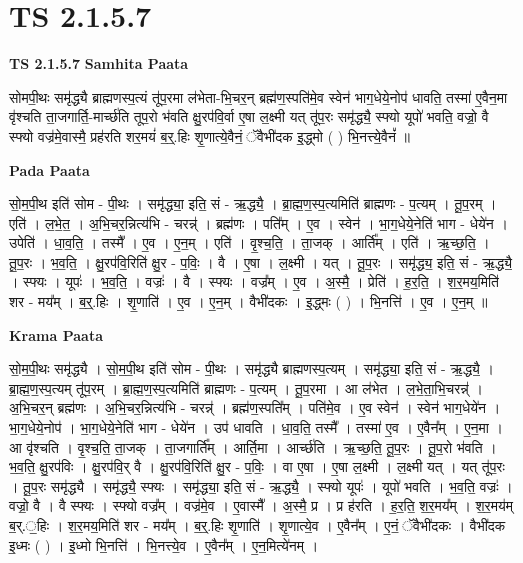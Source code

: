 \documentclass[17pt]{extarticle}
\begin{document}
\section{ TS 2.1.5.7 }

\textbf{TS 2.1.5.7 } \newline
\textbf{Samhita Paata} \newline

सोमपी॒थः समृ॑द्ध्यै ब्राह्मणस्प॒त्यं तू॑प॒रमा ल॑भेता-भि॒चर॒न् ब्रह्म॑ण॒स्पति॑मे॒व स्वेन॑ भाग॒धेये॒नोप॑ धावति॒ तस्मा॑ ए॒वैन॒मा वृ॑श्चति ता॒जगार्ति॒-मार्च्छ॑ति तूप॒रो भ॑वति क्षु॒रप॑वि॒र्वा ए॒षा ल॒क्ष्मी यत् तू॑प॒रः समृ॑द्ध्यै॒ स्फ्यो यूपो॑ भवति॒ वज्रो॒ वै स्फ्यो वज्र॑मे॒वास्मै॒ प्रह॑रति शर॒मयं॑ ब॒र्॒.हिः शृ॒णात्ये॒वैनं॒ ॅवैभी॑दक इ॒द्ध्मो ( ) भि॒नत्त्ये॒वैनं᳚ ॥ \newline

\textbf{Pada Paata} \newline

सो॒म॒पी॒थ इति॑ सोम - पी॒थः । समृ॑द्ध्या॒ इति॒ सं - ऋ॒द्ध्यै॒ । ब्रा॒ह्म॒ण॒स्प॒त्यमिति॑ ब्राह्मणः - प॒त्यम् । तू॒प॒रम् । एति॑ । ल॒भे॒त॒ । अ॒भि॒चर॒न्नित्य॑भि - चरन्न्॑ । ब्रह्म॑णः । पति᳚म् । ए॒व । स्वेन॑ । भा॒ग॒धेये॒नेति॑ भाग - धेये॑न । उपेति॑ । धा॒व॒ति॒ । तस्मै᳚ । ए॒व । ए॒न॒म् । एति॑ । वृ॒श्च॒ति॒ । ता॒जक् । आर्ति᳚म् । एति॑ । ऋ॒च्छ॒ति॒ । तू॒प॒रः । भ॒व॒ति॒ । क्षु॒रप॑वि॒रिति॑ क्षु॒र - प॒विः॒ । वै । ए॒षा । ल॒क्ष्मी । यत् । तू॒प॒रः । समृ॑द्ध्य॒ इति॒ सं - ऋ॒द्ध्यै॒ । स्फ्यः । यूपः॑ । भ॒व॒ति॒ । वज्रः॑ । वै । स्फ्यः । वज्र᳚म् । ए॒व । अ॒स्मै॒ । प्रेति॑ । ह॒र॒ति॒ । श॒र॒मय॒मिति॑ शर - मय᳚म् । ब॒र्॒.हिः । शृ॒णाति॑ । ए॒व । ए॒न॒म् । वैभी॑दकः । इ॒द्ध्मः ( ) । भि॒नत्ति॑ । ए॒व । ए॒न॒म् ॥  \newline


\textbf{Krama Paata} \newline

सो॒म॒पी॒थः समृ॑द्ध्यै । सो॒म॒पी॒थ इति॑ सोम - पी॒थः । समृ॑द्ध्यै ब्राह्मणस्प॒त्यम् । समृ॑द्ध्या॒ इति॒ सं - ऋ॒द्ध्यै॒ । ब्रा॒ह्म॒ण॒स्प॒त्यम् तू॑प॒रम् । ब्रा॒ह्म॒ण॒स्प॒त्यमिति॑ ब्राह्मणः - प॒त्यम् । तू॒प॒रमा । आ ल॑भेत । ल॒भे॒ता॒भि॒चरन्न्॑ । अ॒भि॒चर॒न् ब्रह्म॑णः । अ॒भि॒चर॒न्नित्य॑भि - चरन्न्॑ । ब्रह्म॑ण॒स्पति᳚म् । पति॑मे॒व । ए॒व स्वेन॑ । स्वेन॑ भाग॒धेये॑न । भा॒ग॒धेये॒नोप॑ । भा॒ग॒धेये॒नेति॑ भाग - धेये॑न । उप॑ धावति । धा॒व॒ति॒ तस्मै᳚ । तस्मा॑ ए॒व । ए॒वैन᳚म् । ए॒न॒मा । आ वृ॑श्चति । वृ॒श्च॒ति॒ ता॒जक् । ता॒जगार्ति᳚म् । आर्ति॒मा । आर्च्छ॑ति । ऋ॒च्छ॒ति॒ तू॒प॒रः । तू॒प॒रो भ॑वति । भ॒व॒ति॒ क्षु॒रप॑विः । क्षु॒रप॑वि॒र् वै । क्षु॒रप॑वि॒रिति॑ क्षु॒र - प॒विः॒ । वा ए॒षा । ए॒षा ल॒क्ष्मी । ल॒क्ष्मी यत् । यत् तू॑प॒रः । तू॒प॒रः समृ॑द्ध्यै । समृ॑द्ध्यै॒ स्फ्यः । समृ॑द्ध्या॒ इति॒ सं - ऋ॒द्ध्यै॒ । स्फ्यो यूपः॑ । यूपो॑ भवति । भ॒व॒ति॒ वज्रः॑ । वज्रो॒ वै । वै स्फ्यः । स्फ्यो वज्र᳚म् । वज्र॑मे॒व । ए॒वास्मै᳚ । अ॒स्मै॒ प्र । प्र ह॑रति । ह॒र॒ति॒ श॒र॒मय᳚म् । श॒र॒मय॑म् ब॒र्.॒हिः । श॒र॒मय॒मिति॑ शर - मय᳚म् । ब॒र्॒.हिः शृ॒णाति॑ । शृ॒णात्ये॒व । ए॒वैन᳚म् । ए॒नं॒ ॅवैभी॑दकः । वैभी॑दक इ॒ध्मः ( ) । इ॒ध्मो भि॒नत्ति॑ । भि॒नत्त्ये॒व । ए॒वैन᳚म् । 
ए॒न॒मित्ये॑नम् । \newline
\end{document}
